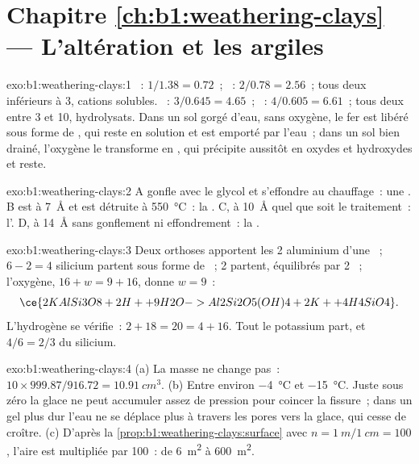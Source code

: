\section*{Chapitre \ref{ch:b1:weathering-clays} --- L'altération et les argiles}

\begin{solution}{exo:b1:weathering-clays:1}
~: $1/1.38 = 0.72$~; ~: $2/0.78 = 2.56$~; tous deux inférieurs à 3, cations
solubles. ~: $3/0.645 = 4.65$~; ~: $4/0.605 = 6.61$~; tous deux
entre 3 et 10, hydrolysats. Dans un sol gorgé d'eau, sans oxygène, le fer est
libéré sous forme de , qui reste en solution et est emporté par
l'eau~; dans un sol bien drainé, l'oxygène le transforme en , qui
précipite aussitôt en oxydes et hydroxydes et reste.
\end{solution}

\begin{solution}{exo:b1:weathering-clays:2}
A gonfle avec le glycol et s'effondre au chauffage~: une . B est à
\SI{7}{\angstrom} et est détruite à \SI{550}{\celsius}~: la . C, à
\SI{10}{\angstrom} quel que soit le traitement~: l'. D, à \SI{14}{\angstrom}
sans gonflement ni effondrement~: la .
\end{solution}

\begin{solution}{exo:b1:weathering-clays:3}
Deux orthoses apportent les 2 aluminium d'une ~; $6 - 2 = 4$ silicium
partent sous forme de ~; 2  partent, équilibrés par 2 ~; l'oxygène,
$16 + w = 9 + 16$, donne $w = 9$~:
\[
  \ce{2 KAlSi3O8 + 2 H+ + 9 H2O -> Al2Si2O5(OH)4 + 2 K+ + 4 H4SiO4}.
\]
L'hydrogène se vérifie~: $2 + 18 = 20 = 4 + 16$. Tout le potassium part, et $4/6 =
2/3$ du silicium.
\end{solution}

\begin{solution}{exo:b1:weathering-clays:4}
(a) La masse ne change pas~: $10 \times 999.87/916.72 = \qty{10.91}{cm^3}$.
(b) Entre environ \qty{-4}{\celsius} et \qty{-15}{\celsius}. Juste sous zéro
la glace ne peut accumuler assez de pression pour coincer la fissure~; dans un gel plus dur
l'eau ne se déplace plus à travers les pores vers la glace, qui cesse de
croître. (c) D'après la
\cref{prop:b1:weathering-clays:surface} avec $n = \qty{1}{m}/\qty{1}{cm} = 100$,
l'aire est multipliée par 100~: de \qty{6}{m^2} à \qty{600}{m^2}.
\end{solution}


